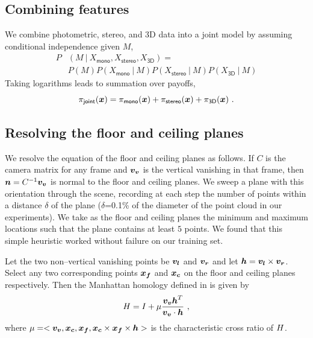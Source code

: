 \subsection{Combining features}
We combine photometric, stereo, and 3D data into a joint model by
assuming conditional independence given $M$,
\begin{equation}
  \begin{split}
    P&(M ~|~ X_{\textsf{mono}}, X_{\textsf{stereo}}, X_{\textsf{3D}}) = \\
    & P(M) 
      P(X_{\textsf{mono}} ~|~ M)
      P(X_{\textsf{stereo}} ~|~ M)
      P(X_{\textsf{3D}} ~|~ M)
  \end{split}
\end{equation}
Taking logarithms leads to summation over payoffs,
\begin{equation}
  \pi_{\textsf{joint}}(\boldsymbol{x}) =
  \pi_{\textsf{mono}}(\boldsymbol{x}) + 
  \pi_{\textsf{stereo}}(\boldsymbol{x}) +
  \pi_{\textsf{3D}}(\boldsymbol{x}) ~.
\end{equation}

\subsection{Resolving the floor and ceiling planes}
\label{sect:floorceil}
We resolve the equation of the floor and ceiling planes as follows. If
$C$ is the camera matrix for any frame and $\boldsymbol{v_v}$ is the vertical
vanishing in that frame, then $\boldsymbol{n} = C^{-1}\boldsymbol{v_v}$ is normal to
the floor and ceiling planes. We sweep a plane with this orientation
through the scene, recording at each step the number of points within
a distance $\delta$ of the plane ($\delta$=0.1\% of the diameter of
the point cloud in our experiments). We take as the floor and ceiling
planes the minimum and maximum locations such that the plane contains
at least $5$ points. We found that this simple heuristic worked
without failure on our training set.

Let the two non--vertical vanishing points be $\boldsymbol{v_l}$ and $\boldsymbol{v_r}$ and
let $\boldsymbol{h}=\boldsymbol{v_l}\times\boldsymbol{v_r}$. Select any two corresponding points
$\boldsymbol{x_f}$ and $\boldsymbol{x_c}$ on the floor and ceiling planes
respectively. Then the Manhattan homology defined in 
is given by
\begin{equation}
  H = I + \mu\frac{\boldsymbol{v_v}\boldsymbol{h}^T}{\boldsymbol{v_v} \cdot \boldsymbol{h}} ~,
\end{equation}
where $\mu = <\boldsymbol{v_v},\boldsymbol{x_c},\boldsymbol{x_f},
\boldsymbol{x_c}\times\boldsymbol{x_f}\times\boldsymbol{h}>$ is the characteristic cross
ratio of $H$.

